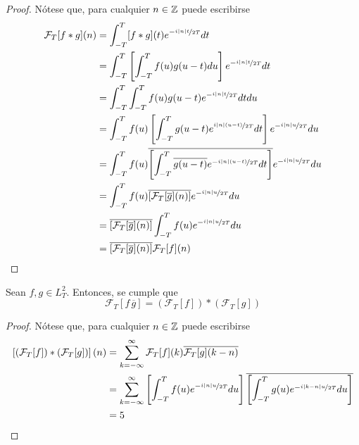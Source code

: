 \begin{proof}
Nótese que, para cualquier $n \in \mathbb{Z}$ puede escribirse
\begin{align*}
\mathcal{F}_T[f \ast g] (n)
&= \int_{- T }^{ T } [f\ast g](t) e^{-\nicefrac{ i \left| n \right| t}{2T}} dt \\
&= \int_{- T }^{ T } \left[ \int_{- T }^{ T } f(u) g(u-t) du \right] e^{-\nicefrac{ i \left| n \right| t}{2T}} dt \\
&= \int_{- T }^{ T } \int_{- T }^{ T } f(u) g(u-t) e^{-\nicefrac{ i \left| n \right| t}{2T}} dt du \\
&= \int_{- T }^{ T } f(u) \left[ \int_{- T }^{ T } g(u-t) e^{\nicefrac{ i \left| n \right| (u-t)}{2T}} dt \right] e^{-\nicefrac{ i \left| n \right| u}{2T}} du \\
&= \int_{- T }^{ T } f(u) \overline{\left[ \int_{- T }^{ T } \overline{g(u-t)} e^{-\nicefrac{ i \left| n \right| (u-t)}{2T}} dt \right]} e^{-\nicefrac{ i \left| n \right| u}{2T}} du \\
&= \int_{- T }^{ T } f(u) \overline{\left[ \mathcal{F}_T[\overline{g}](n) \right]} e^{-\nicefrac{ i \left| n \right| u}{2T}} du \\
&= \overline{\left[ \mathcal{F}_T[\overline{g}](n) \right]} \int_{- T }^{ T } f(u) e^{-\nicefrac{ i \left| n \right| u}{2T}} du \\
&= \overline{\left[ \mathcal{F}_T[\overline{g}](n) \right]} \mathcal{F}_T[f] (n)
\end{align*}
\end{proof}

\begin{teorema}
Sean $f, g \in L^{2}_T$. Entonces, se cumple que
\begin{equation}
\mathcal{F}_T[ f\, \overline{g}] = \left( \mathcal{F}_T[f] \right) \ast \left( \mathcal{F}_T[g] \right)
\end{equation}
\end{teorema}

\begin{proof}
Nótese que, para cualquier $n \in \mathbb{Z}$ puede escribirse
\begin{align*}
\left[\left( \mathcal{F}_T[f] \right) \ast \left( \mathcal{F}_T[g] \right)\right](n)
&=
\sum_{k=-\infty}^{\infty} \mathcal{F}_T[f](k) \overline{\mathcal{F}_T[g](k-n)} \\
&=
\sum_{k=-\infty}^{\infty} \left[ \int_{- T }^{ T } f(u) e^{-\nicefrac{ i \left| n \right| u}{2T}} du \right] \overline{\left[ \int_{- T }^{ T } g(u) e^{-\nicefrac{ i \left| k-n \right| u}{2T}} du \right]} \\
&= 5
\end{align*}
\end{proof}

